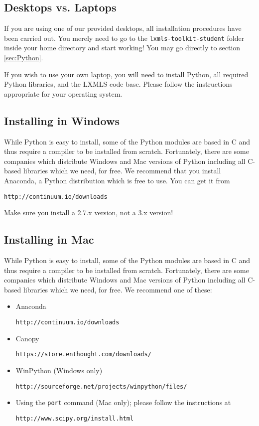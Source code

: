 \subsection{Desktops vs. Laptops}

If you are using one of our provided desktops, all installation procedures have been carried out. You merely need to go to the \verb+lxmls-toolkit-student+ folder inside your home directory and start working! You may go directly to section \ref{sec:Python}.

If you wish to use your own laptop, you will need to install Python, all required Python libraries, and the LXMLS code base. Please follow the instructions appropriate for your operating system.

\subsection{Installing in Windows}

While Python is easy to install, some of the Python modules are based in C and thus require a compiler to be installed from scratch. Fortunately, there are some companies which distribute Windows and Mac versions of Python including all C-based libraries which we need, for free. We recommend that you install Anaconda, a Python distribution which is free to use. You can get it from
\begin{verbatim}
http://continuum.io/downloads
\end{verbatim}

Make sure you install a 2.7.x version, not a 3.x version!

\subsection{Installing in Mac}

While Python is easy to install, some of the Python modules are based in C and thus require a compiler to be installed from scratch. Fortunately, there are some companies which distribute Windows and Mac versions of Python including all C-based libraries which we need, for free. We recommend one of these:

\begin{itemize}
\item Anaconda 
\begin{verbatim}
http://continuum.io/downloads
\end{verbatim}
%
\item Canopy
\begin{verbatim}
https://store.enthought.com/downloads/
\end{verbatim}
%
\item WinPython (Windows only)
\begin{verbatim}
http://sourceforge.net/projects/winpython/files/
\end{verbatim}
%
\item Using the \verb+port+ command (Mac only); please follow the instructions at
\begin{verbatim}
http://www.scipy.org/install.html
\end{verbatim}
%
\end{itemize}

